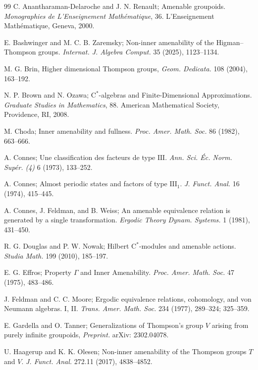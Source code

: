 \documentclass{amsart}
\theoremstyle{remark}
\theoremstyle{definition}
\begin{document}
\begin{thebibliography}{99}
 C. Anantharaman-Delaroche and J. N. Renault; Amenable groupoids. \emph{Monographies
de L'Enseignement Math\'ematique}, 36. L'Enseignement Math\'ematique, Geneva, 2000.

 E. Bashwinger and M. C. B. Zaremsky; Non-inner amenability of the Higman--Thompson groups. \emph{Internat. J. Algebra Comput.} 35 (2025), 1123--1134.

  M. G. Brin, Higher dimensional Thompson groups, \emph{Geom. Dedicata.} 108 (2004), 163--192.

 N. P. Brown and N. Ozawa; $\mathrm{C}^*$-algebras and Finite-Dimensional Approximations. \emph{Graduate Studies in Mathematics}, 88. American Mathematical Society, Providence, RI, 2008.

 M. Choda; Inner amenability and fullness. \emph{Proc. Amer. Math. Soc.} 86 (1982), 663--666.

 A. Connes; Une classification des facteurs de type $\mathrm{III}$. \emph{Ann. Sci. \'{E}c. Norm. Sup\'{e}r. (4)} 6 (1973), 133--252.

 A. Connes; Almost periodic states and factors of type $\mathrm{III}_1$. \emph{J. Funct. Anal.} 16 (1974), 415--445.

 A. Connes, J. Feldman, and B. Weiss; An amenable equivalence relation is generated by a single transformation. \emph{Ergodic Theory Dynam. Systems.} 1 (1981), 431--450.

 R. G. Douglas and P. W. Nowak; Hilbert $\mathrm{C}^*$-modules and amenable actions. \emph{Studia Math.} 199 (2010), 185--197.

 E. G. Effros; Property $\Gamma$ and Inner Amenability. \emph{Proc. Amer. Math. Soc.} 47 (1975), 483--486.

 J. Feldman and C. C. Moore; Ergodic equivalence relations, cohomology, and von Neumann algebras. I, II. \emph{Trans. Amer. Math. Soc.} 234 (1977), 289--324; 325--359.

  E. Gardella and O. Tanner; Generalizations of Thompson's group $V$ arising from purely infinite groupoids,
\emph{Preprint.} arXiv: 2302.04078.

 U. Haagerup and K. K. Olesen; Non-inner amenability of the Thompson groups $T$ and $V$. \emph{J. Funct. Anal.} 272.11 (2017), 4838--4852.


\end{thebibliography}
\end{document}
